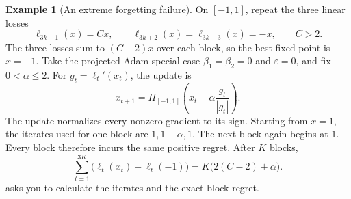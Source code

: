 \documentclass[11pt,twoside]{article}
\theoremstyle{definition}
\newtheorem{example}[theorem]{Example}
\theoremstyle{remark}
\begin{document}
\begin{example}[An extreme forgetting failure]
\label{ex:adam-forgetting}
On $[-1,1]$, repeat the three linear losses
\[
 \ell_{3k+1}(x)=Cx,
 \qquad
 \ell_{3k+2}(x)=\ell_{3k+3}(x)=-x,
 \qquad C>2.
\]
The three losses sum to $(C-2)x$ over each block, so the best fixed point is
$x=-1$. Take the projected Adam special case $\beta_1=\beta_2=0$ and
$\varepsilon=0$, and fix $0<\alpha\le2$. For
$g_t=\ell_t'(x_t)$, the update is
\begin{equation}
 x_{t+1}=\Pi_{[-1,1]}
 \left(x_t-\alpha\frac{g_t}{|g_t|}\right).
 \label{eq:adam-forgetting-update}
\end{equation}
The update normalizes every nonzero gradient to its sign. Starting from
$x=1$, the iterates used for one block are
$1,1-\alpha,1$. The next block again begins at $1$. Every block therefore
incurs the same positive regret. After $K$ blocks,
\begin{equation}
 \sum_{t=1}^{3K}\bigl(\ell_t(x_t)-\ell_t(-1)\bigr)
 =K\bigl(2(C-2)+\alpha\bigr).
 \label{eq:adam-linear-regret}
\end{equation}
 asks you to calculate the iterates and the exact
block regret.
\end{example}
\end{document}
